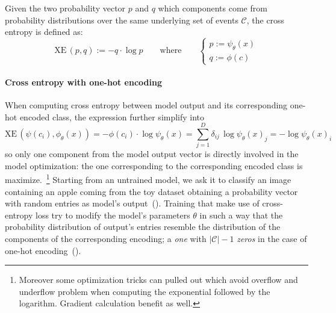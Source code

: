 Given the two probability vector $p$ and $q$  which components come from
probability distributions over the same underlying set of events $\mathcal{C}$,
the cross entropy is defined as:
\begin{equation}
  \textrm{XE} \, (p, q) := - q \cdot \log p
  \label{eq:cross-entropy}
  \qquad \textrm{where} \qquad
  \begin{cases}
    p := \psi_\theta(x) \\
    q := \phi(c)
  \end{cases}
\end{equation}

\paragraph{Cross entropy with one-hot encoding} When computing cross entropy
between model output and its corresponding one-hot encoded class, the expression
further simplify into
\begin{equation*}
  \textrm{XE} \, (\psi(c_i),\phi_\theta(x))
  = - \phi(c_i) \cdot \log \psi_\theta(x)
  = \sum_{j = 1}^D \delta_{ij} \, \log \psi_\theta(x)_j
  = - \log \psi_\theta(x)_i
  \label{eq:cross-entropy-one-hot-encoding}
\end{equation*}
so only one component from the model output vector is directly involved in the
model optimization: the one corresponding to the corresponding encoded class is
maximize.~\footnote{Moreover some optimization tricks can pulled out which avoid
  overflow and underflow problem when computing the exponential followed by the
logarithm. Gradient calculation benefit as well.}
Starting from an untrained model, we ask it to classify an image containing an
apple coming from the toy dataset obtaining a probability vector with random
entries as model's output~(). Training that make
use of cross-entropy loss try to modify the model's parameters $\theta$ in such
a way that the probability distribution of output's entries resemble the
distribution of the components of the corresponding encoding; a \emph{one} with
$|\mathcal{C}| - 1$ \emph{zeros} in the case of one-hot
encoding~().
